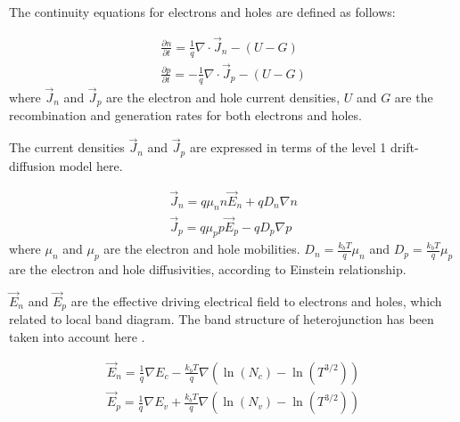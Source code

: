 \documentclass[oneside,12pt]{cgd_book}
\begin{document}
\par
{}The continuity equations for electrons and holes are defined as follows:
\par
\par
\begin{subequations}
\begin{align}
 \frac{\partial n}{\partial t}  = \frac{1}{q}\nabla \cdot \vec{J}_n - (U - G) \\
 \frac{\partial p}{\partial t}  = - \frac{1}{q}\nabla \cdot \vec{J}_p - (U - G)
\end{align}
\end{subequations}
where $\vec{J}_n$ and $\vec{J}_p$ are the electron
      and hole current densities, $U$ and $G$ are the
      recombination and generation rates for both electrons and holes.
\par
{}The current densities
$\vec{J}_n$ and $\vec{J}_p$ are expressed in terms of the level 1 drift-diffusion model here.
\par
\par
\begin{subequations}
\label{eq:Equation:DDML1:DDMCurrent}
\begin{align}
 \vec{J}_n  = q\mu_n n \vec{E}_n + q D_n \nabla n \\
 \vec{J}_p  = q\mu_p p \vec{E}_p - q D_p \nabla p
\end{align}
\end{subequations}
where $\mu_n$ and $\mu_p$ are the
      electron and hole mobilities. $D_n=\frac{k_bT}{q}\mu_n$ and
$D_p=\frac{k_bT}{q}\mu_p$ are the electron and hole diffusivities, according to Einstein
      relationship.
\par
{}$\vec{E}_n$ and $\vec{E}_p$
are the effective
        driving electrical field to electrons and holes, which related to local band diagram. The band structure of
        heterojunction has been taken into account here \cite[Lindefelt1994]{}.
\par
\par
\begin{subequations}
\label{eq:Equation:DDML1:DrivingField}
\begin{align}
 \vec{E}_n  = \frac{1}{q}\nabla E_c - \frac{k_b T}{q}\nabla \left( \ln (N_c ) - \ln (T^{3/2} )
        \right) \\
 \vec{E}_p  = \frac{1}{q}\nabla E_v + \frac{k_b T}{q}\nabla \left( \ln (N_v ) - \ln (T^{3/2} )
        \right)
\end{align}
\end{subequations}
\end{document}
